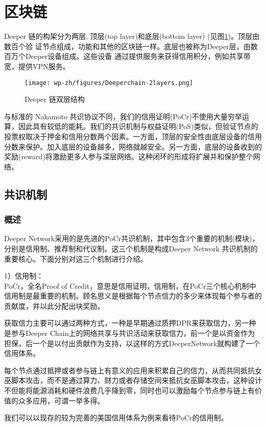 \documentclass[a4paper]{article}
\begin{document}
\newpage
\section{区块链}
Deeper 链的构架分为两层, 顶层(top layer)和底层(bottom layer) (见图\ref{fig:2-layers})。顶层由数百个验
证节点组成，功能和其他的区块链一样。底层也被称为Deeper层，由数百万个Deeper设备组成。这些设备 通过提供服务来获得信用积分，例如共享带宽，提供VPN服务。

\begin{figure}[hhhh]
\centering
\texttt{[image: wp-zh/figures/Deeperchain-2layers.png]}
\caption{Deeper 链双层结构}
\label{fig:2-layers}
\end{figure}

与标准的 Nakamoto 共识协议不同，我们的信用证明(PoCr)不使用大量穷举运算，因此具有较低的能耗。我们的共识机制与权益证明(PoS)类似，但验证节点的投票权取决于押金和信用分数两个因素。一方面，顶层的安全性由底层设备的信用分数来保护。加入底层的设备越多，网络就越安全。另一方面，底层的设备收到的奖励(reward)将激励更多人参与深层网络。这种闭环的形成将扩展并和保护整个网络。

\subsection{共识机制}
\subsubsection{概述}
Deeper Network采用的是先进的PoCr共识机制，其中包含3个重要的机制(模块)，分别是信用制、推荐制和代议制。这三个机制是构成Deeper Network 共识机制的重要核心。下面分别对这三个机制进行介绍。

 1）信用制：\\
PoCr，全名Proof of Credit，意思是信用证明，信用制，在PoCr三个核心机制中信用制是最重要的机制。顾名思义是根据每个节点信力的多少来体现每个参与者的贡献度，并以此分配出块奖励。

获取信力主要可以通过两种方式，一种是早期通过质押DPR来获取信力，另一种是参与Deeper Chain上的网络共享与共识活动来获取信力，前一个是以资金作为担保，后一个是以付出贡献作为支持，以这样的方式DeeperNetwork就构建了一个信用体系。

每个节点通过抵押或者参与链上有意义的应用来积累自己的信力，从而共同抵抗女巫脚本攻击，而不是通过算力、财力或者存储空间来抵抗女巫脚本攻击，这种设计不但能将能源消耗和硬件浪费几乎降到零，同时也可以激励每个节点参与链上有价值的众多应用，可谓一举多得。

我们可以以现存的较为完善的美国信⽤体系为例来看待PoCr的信用制。
\end{document}
